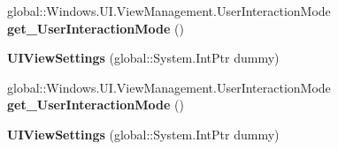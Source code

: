 \begin{DoxyCompactItemize}
global\+::\+Windows.\+U\+I.\+View\+Management.\+User\+Interaction\+Mode {\bfseries get\+\_\+\+User\+Interaction\+Mode} ()
\item 
\mbox{\label{class_windows_1_1_u_i_1_1_view_management_1_1_u_i_view_settings_a322a02168f2379ad66c0438f9bdd15c6}} 
{\bfseries U\+I\+View\+Settings} (global\+::\+System.\+Int\+Ptr dummy)
\item 
\mbox{\label{class_windows_1_1_u_i_1_1_view_management_1_1_u_i_view_settings_a5539be61515aa963fb6f97642dedc4c0}} 
global\+::\+Windows.\+U\+I.\+View\+Management.\+User\+Interaction\+Mode {\bfseries get\+\_\+\+User\+Interaction\+Mode} ()
\item 
\mbox{\label{class_windows_1_1_u_i_1_1_view_management_1_1_u_i_view_settings_a322a02168f2379ad66c0438f9bdd15c6}} 
{\bfseries U\+I\+View\+Settings} (global\+::\+System.\+Int\+Ptr dummy)
\end{DoxyCompactItemize}

